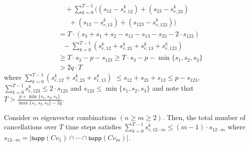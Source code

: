 {\begin{equation}
\begin{aligned}
	& \quad+ \sum_{k=0}^ {T-1} \bigg (  (s_{12} - s_{r,12}^k ) + (s_{23} - s_{r,23}^k) \\ &~~~~~~~+ (s_{13} - s_{r,13}^k) + ( s_{123} - s_{r,123}^k) \bigg) \\
	&= T \cdot (s_3 + s_1 + s_2 - s_{12} - s_{13} - s_{23} - 2 \cdot s_{123}) \\&~~~ - \sum_{k=0}^{T-1} ( s_{r,12}^k + s_{r,23}^k + s_{r,13}^k  + s_{r,123}^k ) \\
	& \ge T \cdot s_3 - p - s_{123} \ge T \cdot s_3 - p - \min \{ s_1, s_2, s_3 \} \\
	& > 2q \cdot T
		\nonumber 
\end{aligned}
\end{equation}
where
$\sum_{k=0}^{T-1} (s_{r,12}^k + s_{r,23}^k + s_{r,13}^k   )$ $\le s_{12} + s_{23} + s_{13} $$ \le p - s_{123}$, $\sum_{k=0}^{T-1} s_{r,123}^k \le 2 \cdot s_{123}$ and $ s_{123} \le \min \{ s_1, s_2, s_3 \}$ and note that $T > \frac { p + \min \{ s_1, s_2, s_3 \}} { \max \{s_1, s_2, s_3 \} - 2q }$.
}
\begin{prop} \label{prop:m_vec}
Consider $m$ eigenvector combinations $(n\ge m \ge 2)$. Then, the total number of cancellations over $T$ time steps satisfies $\sum_{k=0}^{T-1} s_{r,12 \cdots m}^k \le (m-1)\cdot s_{12 \cdots m}$ where $s_{12\cdots m} = \lvert \textsf{supp} (Cv_1) \cap \cdots \cap \textsf{supp} (Cv_m) \rvert$.
\end{prop}

